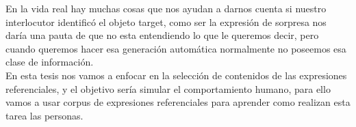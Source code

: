 En la vida real hay muchas cosas que nos ayudan a darnos cuenta si nuestro interlocutor identific\'o el objeto target, como ser la expresi\'on de sorpresa nos dar\'ia una pauta de que no esta entendiendo lo que le queremos decir, pero cuando queremos hacer esa generaci\'on autom\'atica normalmente no poseemos esa clase de informaci\'on.\\

En esta tesis nos vamos a enfocar en la selecci\'on de contenidos de las expresiones referenciales, y el objetivo ser\'ia simular el comportamiento humano, para ello vamos a usar corpus de expresiones referenciales para aprender como realizan esta tarea las personas.\\

